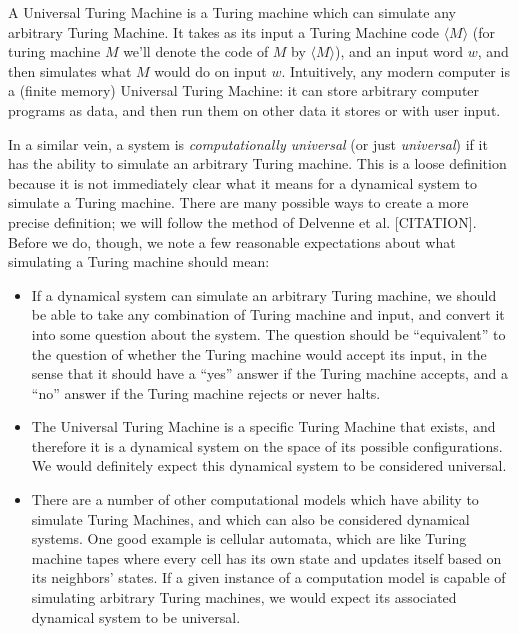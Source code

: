 \documentclass{fkpaper}
\begin{document}
\begin{multicols}{2}
A Universal Turing Machine is a Turing machine which can simulate any
arbitrary Turing Machine. It takes as its input a Turing Machine code $\langle M \rangle$ (for turing machine $M$ we'll denote the code of $M$ by $\langle M \rangle$), and an input word $w$, and then simulates what $M$ would do on input $w$. Intuitively, any modern computer is a (finite memory) Universal Turing Machine: it can store arbitrary computer programs as data, and then run them on other data it stores or with user input.

In a similar vein, a system is {\it computationally universal} (or
just {\it universal}) if it has the ability to simulate an arbitrary
Turing machine. This is a loose definition because it is not
immediately clear what it means for a dynamical system to simulate a
Turing machine. There are many possible ways to create a more precise
definition; we will follow the method of Delvenne et al. [CITATION].
Before we do, though, we note a few reasonable expectations about what
simulating a Turing machine should mean:

\begin{itemize}
  \item If a dynamical system can simulate an arbitrary Turing machine, we should be able to take any combination of Turing machine and input, and convert it into some question about the system. The question should be ``equivalent'' to the question of whether the Turing machine would accept its input, in the sense that it should have a ``yes'' answer if the Turing machine accepts, and a ``no'' answer if the Turing machine rejects or never halts.

  \item The Universal Turing Machine is a specific Turing Machine that exists, and therefore it is a dynamical system on the space of its possible configurations. We would definitely expect this dynamical system to be considered universal.

  \item There are a number of other computational models which have ability to simulate Turing Machines, and which can also be considered dynamical systems. One good example is cellular automata, which are like Turing machine tapes where every cell has its own state and updates itself based on its neighbors' states. If a given instance of a computation model is capable of simulating arbitrary Turing machines, we would expect its associated dynamical system to be universal.

\end{itemize}


\end{multicols}
\end{document}
